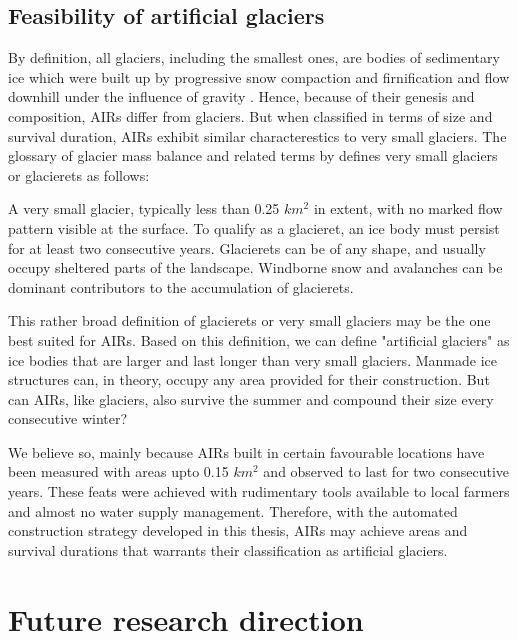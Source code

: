 \subsection{Feasibility of artificial glaciers}

By definition, all glaciers, including the smallest ones, are bodies of sedimentary ice which were built up by
progressive snow compaction and firnification and flow downhill under the influence of gravity
\cite{benndouglasiGlaciersGlaciation2014}. Hence, because of their genesis and composition, AIRs differ from
glaciers. But when classified in terms of size and survival duration, AIRs exhibit similar characterestics to
very small glaciers. The glossary of glacier mass balance and related terms by
\citet{cogleyGlossaryGlacierMass2010} defines very small glaciers or glacierets as follows:

\begin{thesis_quotation}
  A very small glacier, typically less than 0.25 $km^2$ in extent, with no marked flow pattern
  visible at the surface. To qualify as a glacieret, an ice body must persist for at least two consecutive
  years. Glacierets can be of any shape, and usually occupy sheltered parts of the landscape. Windborne snow and
  avalanches can be dominant contributors to the accumulation of glacierets. 
\end{thesis_quotation}

This rather broad definition of glacierets or very small glaciers may be the one best suited for AIRs. Based on
this definition, we can define "artificial glaciers" as ice bodies that are larger and last longer than very
small glaciers. Manmade ice structures can, in theory, occupy any area provided for their construction. But can
AIRs, like glaciers, also survive the summer and compound their size every consecutive winter? 

We believe so, mainly because AIRs built in certain favourable locations have been measured with areas upto 0.15
$km^2$ \cite{nusserSociohydrologyArtificialGlaciers2019} and observed to last for two consecutive years. These
feats were achieved with rudimentary tools available to local farmers and almost no water supply management.
Therefore, with the automated construction strategy developed in this thesis, AIRs may achieve areas and
survival durations that warrants their classification as artificial glaciers.


\section{Future research direction}


